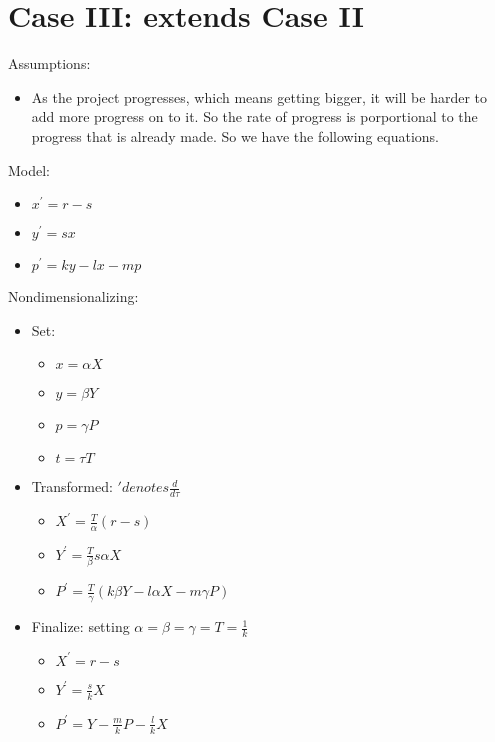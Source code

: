 \documentclass{article}
\newenvironment{atomize}
    {\begin{list} {} {
            \setlength\itemindent{0pt}
            \setlength\leftmargin{10pt}
            \setlength\labelwidth{0pt}
    }}
    {\end{list}}
\begin{document}
	\section*{Case III: extends Case II}
		\begin{atomize}
			\item Assumptions:
				\begin{itemize}
					\item As the project progresses, which means getting bigger, it will be harder to add more progress on to it. So the rate of progress is porportional to the progress that is already made. So we have the following equations.
			\end{itemize}

			\item Model:
				\begin{itemize}
					\item $x^{\prime} = r - s $
					\item $y^{\prime} = sx $
					\item $p^{\prime} = ky-lx-mp $
				\end{itemize}

			\item Nondimensionalizing:
				\begin{itemize}
					\item Set:
							\begin{itemize}
								\item $x = \alpha X $ 
								\item $y = \beta Y $
								\item $p = \gamma P $
								\item $t = \tau T $
							\end{itemize}
					\item Transformed: $\prime  denotes  \frac{d}{d\tau} $
							\begin{itemize}
								\item $X^{\prime} = \frac{T}{\alpha} (r-s) $
								\item $Y^{\prime} = \frac{T}{\beta} s \alpha X $
								\item $P^{\prime} = \frac{T}{\gamma} (k \beta Y - l \alpha X - m \gamma P) $
							\end{itemize}

					\item Finalize: setting $\alpha = \beta = \gamma = T = \frac{1}{k} $
							\begin{itemize}
								\item $X^{\prime} = r - s $
								\item $Y^{\prime} = \frac{s}{k} X $
								\item $P^{\prime} = Y - \frac{m}{k} P - \frac{l}{k} X  $ 	
							\end{itemize}
				\end{itemize}
			
		\end{atomize}
\end{document}
